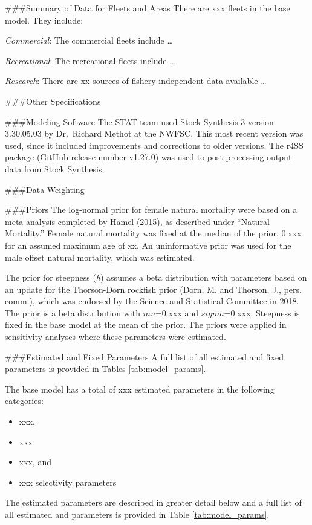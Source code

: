 \documentclass[12pt,]{article}
\begin{document}
\#\#\#Summary of Data for Fleets and Areas There are xxx fleets in the
base model. They include:

\emph{Commercial}: The commercial fleets include \ldots{}

\emph{Recreational}: The recreational fleets include \ldots{}

\emph{Research}: There are xx sources of fishery-independent data
available \ldots{}

\#\#\#Other Specifications

\#\#\#Modeling Software The STAT team used Stock Synthesis 3 version
3.30.05.03 by Dr.~Richard Methot at the NWFSC. This most recent version
was used, since it included improvements and corrections to older
versions. The r4SS package (GitHub release number v1.27.0) was used to
post-processing output data from Stock Synthesis.

\#\#\#Data Weighting

\#\#\#Priors The log-normal prior for female natural mortality were
based on a meta-analysis completed by Hamel
(\protect\hyperlink{ref-Hamel2015}{2015}), as described under ``Natural
Mortality.'' Female natural mortality was fixed at the median of the
prior, 0.xxx for an assumed maximum age of xx. An uninformative prior
was used for the male offset natural mortality, which was estimated.

The prior for steepness (\emph{h}) assumes a beta distribution with
parameters based on an update for the Thorson-Dorn rockfish prior (Dorn,
M. and Thorson, J., pers. comm.), which was endorsed by the Science and
Statistical Committee in 2018. The prior is a beta distribution with
\(mu\)=0.xxx and \(sigma\)=0.xxx. Steepness is fixed in the base model
at the mean of the prior. The priors were applied in sensitivity
analyses where these parameters were estimated.

\#\#\#Estimated and Fixed Parameters A full list of all estimated and
fixed parameters is provided in Tables \ref{tab:model_params}.

The base model has a total of xxx estimated parameters in the following
categories:

\begin{itemize}
  \item xxx,
  \item xxx
  \item xxx, and
  \item xxx selectivity parameters
\end{itemize}

The estimated parameters are described in greater detail below and a
full list of all estimated and parameters is provided in Table
\ref{tab:model_params}.
\end{document}
